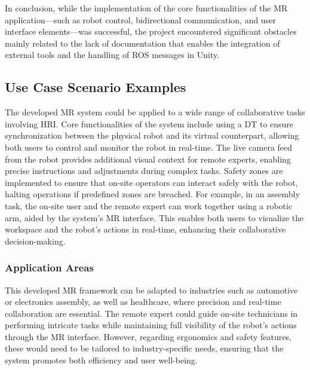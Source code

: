 In conclusion, while the implementation of the core functionalities of the \ac{MR} application—such as robot control, bidirectional communication, and user interface elements—was successful, the project encountered significant obstacles mainly related to the lack of documentation that enables the integration of external tools and the handling of \ac{ROS} messages in Unity.



\subsection{Use Case Scenario Examples}

The developed \ac{MR} system could be applied to a wide range of collaborative tasks involving \ac{HRI}. Core functionalities of the system include using a \ac{DT} to ensure synchronization between the physical robot and its virtual counterpart, allowing both users to control and monitor the robot in real-time. The live camera feed from the robot provides additional visual context for remote experts, enabling precise instructions and adjustments during complex tasks. Safety zones are implemented to ensure that on-site operators can interact safely with the robot, halting operations if predefined zones are breached. For example, in an assembly task, the on-site user and the remote expert can work together using a robotic arm, aided by the system’s \ac{MR} interface. This enables both users to visualize the workspace and the robot’s actions in real-time, enhancing their collaborative decision-making. 

\subsubsection{Application Areas}
This developed \ac{MR} framework can be adapted to industries such as automotive or electronics assembly, as well as healthcare, where precision and real-time collaboration are essential. The remote expert could guide on-site technicians in performing intricate tasks while maintaining full visibility of the robot’s actions through the \ac{MR} interface. However, regarding ergonomics and safety features, these would need to be tailored to industry-specific needs, ensuring that the system promotes both efficiency and user well-being.

